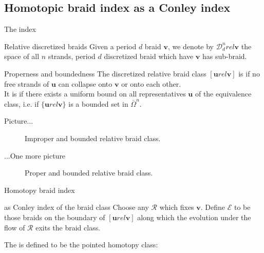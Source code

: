 \documentclass[9pt, english]{beamer}
\theoremstyle{definition}
\newcommand{\simbolovettore}[1]{{\boldsymbol{#1}}}
\newcommand{\vh}{\simbolovettore{h}}
\newcommand{\vu}{\simbolovettore{u}}
\newcommand{\vv}{\simbolovettore{v}}
\begin{document}
\subsection{Homotopic braid index as a Conley index}
\begin{frame}{The index}
    \begin{block}{Relative discretized braids}
        Given a period $d$ braid $\vv$, we denote by $\mathscr D_d^n
        rel\vv$ the space of all $n$ strands, period $d$ discretized braid
        which have $\vv$ has sub-braid.
        \end{block}\pause
    \begin{block}{Properness and boundedness}\pause
        The discretized relative braid class $[\vu rel \vv]$ is {\color{red}{proper}\/}
        if no free strands of $\vu$ can collapse onto $\vv$ or onto each
        other.\pause \\
        It is {\color{red}{bounded}\/} if there exists a uniform bound on all
        representatives $\vu$ of the equivalence class, i.e. if $\{\vu
        rel \vv\}$ is a bounded set in $\bar \Omega^n$.
    \end{block}
\end{frame}
\begin{frame}{Picture...}
\begin{figure}\label{fig:improper_Bounded}
        \caption{Improper and bounded relative braid class.}
        \end{figure}
\end{frame}
\begin{frame}{...One more picture}
\begin{figure}\label{fig:proper_Bounded}
        \caption{Proper and bounded relative braid class.}
        \end{figure}
\end{frame}
\begin{frame}{Homotopy braid index}
    \begin{block}{as Conley index of the braid class}\pause
        Choose any $\mathscr R$ which fixes $\vv$. Define $\mathscr E$
        to be those braids on the boundary of $[\vu rel \vv]$ along
        which the evolution under the flow of $\mathscr R$ exits the
        braid class.\pause

        The {\color{red}{homotopy braid index}\/} is defined to be the pointed homotopy
        class:\pause
        {\color{blue}{
        \[
        \vh([\vu rel\vv]):=([\vu rel \vv]/\mathscr E, \{\mathscr E\}).
        \]}\/}
    \end{block}
\end{frame}
\end{document}
